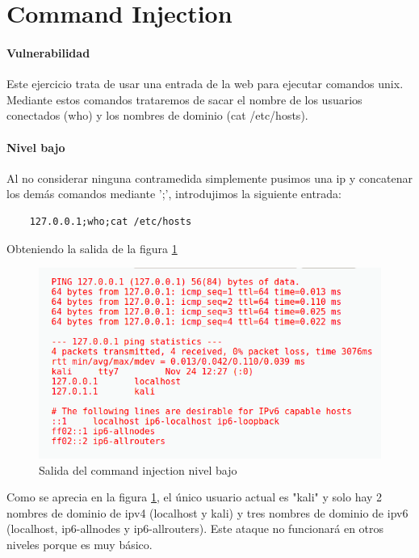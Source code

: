 \section{Command Injection}
\paragraph{Vulnerabilidad} Este ejercicio trata de usar una entrada de la web 
para ejecutar comandos unix. Mediante estos comandos  trataremos de sacar el nombre
de los usuarios conectados (who) y los nombres de dominio (cat /etc/hosts).
\paragraph{Nivel bajo} Al no considerar ninguna contramedida simplemente pusimos 
una ip y concatenar los demás comandos mediante ';', introdujimos la siguiente
entrada:
\begin{lstlisting}
    127.0.0.1;who;cat /etc/hosts
\end{lstlisting}
Obteniendo la salida de la figura \ref{fig:injOutput}
\begin{figure}[ht!]
    \centering
    \includegraphics[width=14cm]{img/cmdinjection/output.png}
    \caption{Salida del command injection nivel bajo}
    \label{fig:injOutput}
\end{figure}
Como se aprecia en la figura \ref{fig:injOutput}, el único usuario actual es "kali"
y solo hay 2 nombres de dominio de ipv4 (localhost y kali) y tres nombres de dominio de ipv6
(localhost, ip6-allnodes y ip6-allrouters).
Este ataque no funcionará en otros niveles porque es muy básico.
